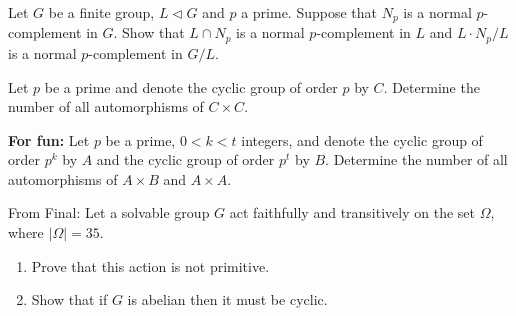 \documentclass{article}
\begin{document}
\begin{homeworkProblem}
    Let $G$ be a finite group, $L \lhd G$ and $p$ a prime.
    Suppose that $N_p$ is a normal $p$-complement in $G$.
    Show that $L \cap N_p$ is a normal $p$-complement in $L$
    and $L \cdot N_p / L$ is a normal $p$-complement in $G/L$.\\
    \solution 
    

\end{homeworkProblem}

\pagebreak

\begin{homeworkProblem}
    Let $p$ be a prime and denote the cyclic group of order $p$ by $C$. 
    Determine the number of all automorphisms of $C \times C$.

\end{homeworkProblem}

\pagebreak

\begin{homeworkProblem}
    \textbf{For fun:} Let $p$ be a prime, $0 < k < t$ integers,
    and denote the cyclic group of order $p^k$ by $A$
    and the cyclic group of order $p^t$ by $B$. Determine the 
    number of all automorphisms of $A \times B$ and $A \times A$.
    
\end{homeworkProblem}

\pagebreak

\begin{homeworkProblem}
    From Final: Let a solvable group $G$ act faithfully and
    transitively on the set $\Omega$, where $\lvert \Omega \rvert = 35$.
    \begin{enumerate}
        \item Prove that this action is not primitive.
        \item Show that if $G$ is abelian then it must be cyclic.
    \end{enumerate}
    
\end{homeworkProblem}
\end{document}
